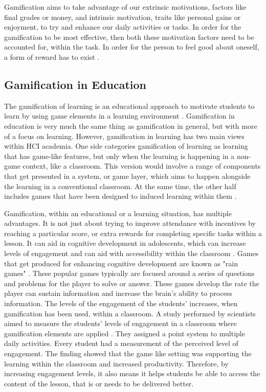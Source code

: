 \documentclass[sigchi]{acmart}
\begin{document}
Gamification aims to take advantage of our extrinsic motivations, factors like final grades or money, and intrinsic motivation, traits like personal gains or enjoyment, to try and enhance our daily activities or tasks. In order for the gamification to be most effective, then both these motivation factors need to be accounted for, within the task. In order for the person to feel good about oneself, a form of reward has to exist \cite{12}. 

\subsection{Gamification in Education}

The gamification of learning is an educational approach to motivate students to learn by using game elements in a learning environment \cite{22}. Gamification in education is very much the same thing as gamification in general, but with more of a focus on learning. However, gamification in learning has two main views within HCI academia. One side categories gamification of learning as learning that has game-like features, but only when the learning is happening in a non-game context, like a classroom. This version would involve a range of components that get presented in a system, or game layer, which aims to happen alongside the learning in a conventional classroom. At the same time, the other half includes games that have been designed to induced learning within them \cite{22}. 

Gamification, within an educational or a learning situation, has multiple advantages. It is not just about trying to improve attendance with incentives by reaching a particular score, or extra rewards for completing specific tasks within a lesson. It can aid in cognitive development in adolescents, which can increase levels of engagement and can aid with accessibility within the classroom \cite{24}. Games that get produced for enhancing cognitive development are known as "rain games" \cite{24}. These popular games typically are focused around a series of questions and problems for the player to solve or answer. These games develop the rate the player can sustain information and increase the brain's ability to process information. The levels of the engagement of the students' increases, when gamification has been used, within a classroom. A study performed by scientists aimed to measure the students' levels of engagement in a classroom where gamification elements are applied \cite{25}. They assigned a point system to multiple daily activities. Every student had a measurement of the perceived level of engagement. The finding showed that the game like setting was supporting the learning within the classroom and increased productivity. Therefore, by increasing engagement levels, it also means it helps students be able to access the content of the lesson, that is or needs to be delivered better. 
\end{document}
